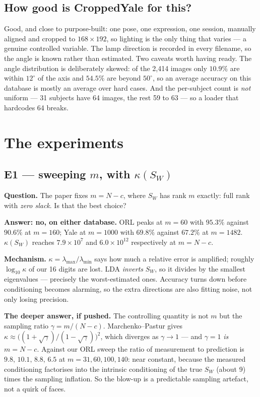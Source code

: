 \documentclass[11pt]{article}
\begin{document}
\subsection{How good is CroppedYale for this?}
Good, and close to purpose-built: one pose, one expression, one session,
manually aligned and cropped to $168\times192$, so lighting is the only thing
that varies --- a genuine controlled variable. The lamp direction is recorded in
every filename, so the angle is known rather than estimated. Two caveats worth
having ready. The angle distribution is deliberately skewed: of the 2,414
images only $10.9\%$ are within $12^\circ$ of the axis and $54.5\%$ are beyond
$50^\circ$, so an average accuracy on this database is mostly an average over
hard cases. And the per-subject count is \emph{not} uniform --- 31 subjects have
64 images, the rest 59 to 63 --- so a loader that hardcodes 64 breaks.

\section{The experiments}

\subsection{E1 --- sweeping $m$, with $\kappa(S_W)$}
\textbf{Question.} The paper fixes $m=N-c$, where $S_W$ has rank $m$ exactly:
full rank with \emph{zero slack}. Is that the best choice?

\textbf{Answer: no, on either database.} ORL peaks at $m=60$ with $95.3\%$
against $90.6\%$ at $m=160$; Yale at $m=1000$ with $69.8\%$ against $67.2\%$ at
$m=1482$. $\kappa(S_W)$ reaches $7.9\times10^{7}$ and $6.0\times10^{12}$
respectively at $m=N-c$.

\textbf{Mechanism.} $\kappa=\lambda_{\max}/\lambda_{\min}$ says how much a
relative error is amplified; roughly $\log_{10}\kappa$ of our 16 digits are
lost. LDA \emph{inverts} $S_W$, so it divides by the smallest eigenvalues ---
precisely the worst-estimated ones. Accuracy turns down before conditioning
becomes alarming, so the extra directions are also fitting noise, not only
losing precision.

\textbf{The deeper answer, if pushed.} The controlling quantity is not $m$ but
the sampling ratio $\gamma=m/(N-c)$. Marchenko--Pastur gives
$\kappa\approx\big((1+\sqrt\gamma)/(1-\sqrt\gamma)\big)^2$, which diverges as
$\gamma\to1$ --- and $\gamma=1$ \emph{is} $m=N-c$. Against our ORL sweep the
ratio of measurement to prediction is $9.8,\,10.1,\,8.8,\,6.5$ at
$m=31,60,100,140$: near constant, because the measured conditioning factorises
into the intrinsic conditioning of the true $S_W$ (about 9) times the sampling
inflation. So the blow-up is a predictable sampling artefact, not a quirk of
faces.
\end{document}

